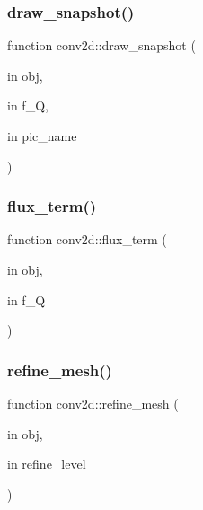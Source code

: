 \mbox{\label{classconv2d_adc1dfdd372d3010d0cc79f2592d68c1a}} 
\subsubsection{\texorpdfstring{draw\+\_\+snapshot()}{draw\_snapshot()}}
{\footnotesize\ttfamily function conv2d\+::draw\+\_\+snapshot (\begin{DoxyParamCaption}\item[{in}]{obj,  }\item[{in}]{f\+\_\+Q,  }\item[{in}]{pic\+\_\+name }\end{DoxyParamCaption})}

\mbox{\label{classconv2d_a86d512419121988b17d016c33871f45a}} 
\subsubsection{\texorpdfstring{flux\+\_\+term()}{flux\_term()}}
{\footnotesize\ttfamily function conv2d\+::flux\+\_\+term (\begin{DoxyParamCaption}\item[{in}]{obj,  }\item[{in}]{f\+\_\+Q }\end{DoxyParamCaption})}

\mbox{\label{classconv2d_a24b9ca0c930547a4cd6e7f0160c1e5f4}} 
\subsubsection{\texorpdfstring{refine\+\_\+mesh()}{refine\_mesh()}}
{\footnotesize\ttfamily function conv2d\+::refine\+\_\+mesh (\begin{DoxyParamCaption}\item[{in}]{obj,  }\item[{in}]{refine\+\_\+level }\end{DoxyParamCaption})}

\mbox{\label{classconv2d_ac7ea96ba4a6d36a3844a747bf0be0f0e}} 
